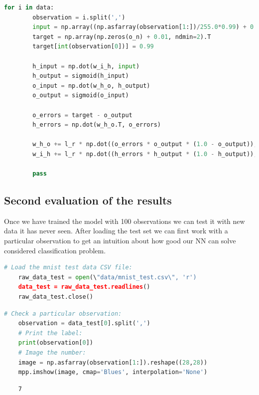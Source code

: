\begin{lstlisting}[language=Python]
    for i in data:
        observation = i.split(',')
        input = np.array((np.asfarray(observation[1:])/255.0*0.99) + 0.01, ndmin=2).T
        target = np.array(np.zeros(o_n) + 0.01, ndmin=2).T
        target[int(observation[0])] = 0.99
    
        h_input = np.dot(w_i_h, input)
        h_output = sigmoid(h_input)
        o_input = np.dot(w_h_o, h_output)
        o_output = sigmoid(o_input)
    
        o_errors = target - o_output
        h_errors = np.dot(w_h_o.T, o_errors)
        
        w_h_o += l_r * np.dot((o_errors * o_output * (1.0 - o_output)), np.transpose(h_output))
        w_i_h += l_r * np.dot((h_errors * h_output * (1.0 - h_output)), np.transpose(input))
    
        pass
\end{lstlisting}

\subsection{Second evaluation of the results}
   
Once we have trained the model with 100 observations we can test it with new data it has never seen. After loading the test set we can first work with a particular observation to get an intuition about how good our NN can solve considered classification problem.

\begin{lstlisting}[language=Python]
    # Load the mnist test data CSV file:
    raw_data_test = open(\"data/mnist_test.csv\", 'r')
    data_test = raw_data_test.readlines()
    raw_data_test.close()
\end{lstlisting}

\begin{lstlisting}[language=Python]
    # Check a particular observation:
    observation = data_test[0].split(',')
    # Print the label:
    print(observation[0])
    # Image the number:
    image = np.asfarray(observation[1:]).reshape((28,28))
    mpp.imshow(image, cmap='Blues', interpolation='None')
\end{lstlisting}

\begin{lstlisting}
    7
\end{lstlisting}

